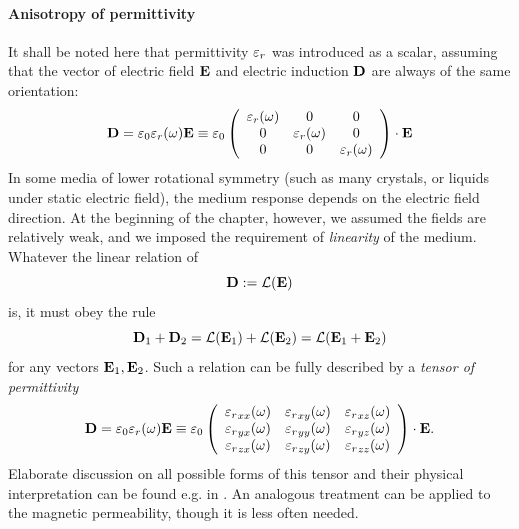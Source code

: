 \paragraph{Anisotropy of permittivity} \label{par_anisotropy} %
It shall be noted here that permittivity $\varepsilon_r$ was introduced as a scalar, assuming that the vector of electric field $\mathbf{E}$ and electric induction $\mathbf{D}$ are always of the same orientation:
\begin{equation} \mathbf{D} = \varepsilon_0 \varepsilon_r(\omega) \mathbf{E} \equiv \varepsilon_0  
	\left(\begin{array}{ccc} 
			\varepsilon_r(\omega) & 0 & 0  \\
			0 & \varepsilon_r(\omega) & 0  \\
			0 & 0 &\varepsilon_r(\omega)  
	\end{array} \right) \cdot \mathbf{E}
	\label{eq_}
\end{equation}
In some media of lower rotational symmetry (such as many crystals, or liquids under static electric field), the medium response depends on the electric field direction. At the beginning of the chapter, however, we assumed the fields are relatively weak, and we imposed the requirement of \textit{linearity} of the medium. Whatever the linear relation of 
$$\mathbf{D} := \mathcal{L}(\mathbf{E})$$
is, it must obey the rule
$$\mathbf{D}_1 + \mathbf{D}_2 = \mathcal{L}(\mathbf{E}_1) + \mathcal{L}(\mathbf{E}_2) = \mathcal{L}(\mathbf{E}_1 + \mathbf{E}_2)$$
for any vectors $\mathbf{E}_1, \mathbf{E}_2$. Such a relation can be fully described by a \textit{tensor of permittivity} %
\begin{equation} \mathbf{D} = \varepsilon_0 \varepsilon_r(\omega) \mathbf{E} \equiv \varepsilon_0  
	\left(\begin{array}{ccc} 
	{\varepsilon_r}_{xx}(\omega) & {\varepsilon_r}_{xy}(\omega) & {\varepsilon_r}_{xz}(\omega)  \\
	{\varepsilon_r}_{yx}(\omega) & {\varepsilon_r}_{yy}(\omega) & {\varepsilon_r}_{yz}(\omega)  \\
	{\varepsilon_r}_{zx}(\omega) & {\varepsilon_r}_{zy}(\omega) & {\varepsilon_r}_{zz}(\omega)  
	\end{array} \right) \cdot \mathbf{E}.
	\label{eq_epstensor}
\end{equation}
Elaborate discussion on all possible forms of this tensor and their physical interpretation can be found e.g. in \cite[pp. 678--686]{born1999book}. An analogous treatment can be applied to the magnetic permeability, though it is less often needed.
